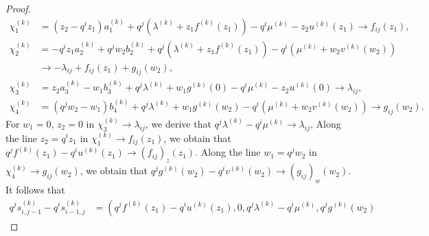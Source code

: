 \documentclass[12pt,reqno]{amsart}%
\theoremstyle{plain}
\numberwithin{theorem}{section} \numberwithin{equation}{section}
\numberwithin{lemma}{section}
\numberwithin{remark}{section}
\numberwithin{example}{section}
\numberwithin{proposition}{section}
\numberwithin{definition}{section}
\numberwithin{corollary}{section}
\begin{document}
\begin{proof}
\begin{align*}
\chi_{1}^{\left(  k\right)  }  &  =\left(  z_{2}-q^{i}z_{1}\right)
a_{1}^{\left(  k\right)  }+q^{j}\left(  \lambda^{\left(  k\right)  }%
+z_{1}f^{\left(  k\right)  }\left(  z_{1}\right)  \right)  -q^{i}\mu^{\left(
k\right)  }-z_{2}u^{\left(  k\right)  }\left(  z_{1}\right)  \rightarrow
f_{ij}\left(  z_{1}\right)  ,\\
\chi_{2}^{\left(  k\right)  }  &  =-q^{i}z_{1}a_{2}^{\left(  k\right)  }%
+q^{j}w_{2}b_{2}^{\left(  k\right)  }+q^{j}\left(  \lambda^{\left(  k\right)
}+z_{1}f^{\left(  k\right)  }\left(  z_{1}\right)  \right)  -q^{i}\left(
\mu^{\left(  k\right)  }+w_{2}v^{\left(  k\right)  }\left(  w_{2}\right)
\right) \\
&  \rightarrow-\lambda_{ij}+f_{ij}\left(  z_{1}\right)  +g_{ij}\left(
w_{2}\right)  ,\\
\chi_{3}^{\left(  k\right)  }  &  =z_{2}a_{3}^{\left(  k\right)  }-w_{1}%
b_{3}^{\left(  k\right)  }+q^{j}\lambda^{\left(  k\right)  }+w_{1}g^{\left(
k\right)  }\left(  0\right)  -q^{i}\mu^{\left(  k\right)  }-z_{2}u^{\left(
k\right)  }\left(  0\right)  \rightarrow\lambda_{ij},\\
\chi_{4}^{\left(  k\right)  }  &  =\left(  q^{j}w_{2}-w_{1}\right)
b_{4}^{\left(  k\right)  }+q^{j}\lambda^{\left(  k\right)  }+w_{1}g^{\left(
k\right)  }\left(  w_{2}\right)  -q^{i}\left(  \mu^{\left(  k\right)  }%
+w_{2}v^{\left(  k\right)  }\left(  w_{2}\right)  \right)  \rightarrow
g_{ij}\left(  w_{2}\right)  .
\end{align*}
For $w_{1}=0$, $z_{2}=0$ in $\chi_{3}^{\left(  k\right)  }\rightarrow
\lambda_{ij}$, we derive that $q^{j}\lambda^{\left(  k\right)  }-q^{i}%
\mu^{\left(  k\right)  }\rightarrow\lambda_{ij}$, Along the line $z_{2}%
=q^{i}z_{1}$ in $\chi_{1}^{\left(  k\right)  }\rightarrow f_{ij}\left(
z_{1}\right)  $, we obtain that $q^{j}f^{\left(  k\right)  }\left(
z_{1}\right)  -q^{i}u^{\left(  k\right)  }\left(  z_{1}\right)  \rightarrow
\left(  f_{ij}\right)  _{z}\left(  z_{1}\right)  $. Along the line
$w_{1}=q^{j}w_{2}$ in $\chi_{4}^{\left(  k\right)  }\rightarrow g_{ij}\left(
w_{2}\right)  $, we obtain that $q^{j}g^{\left(  k\right)  }\left(
w_{2}\right)  -q^{i}v^{\left(  k\right)  }\left(  w_{2}\right)  \rightarrow
\left(  g_{ij}\right)  _{w}\left(  w_{2}\right)  $. It follows that
\begin{align*}
q^{j}s_{i,j-1}^{\left(  k\right)  }-q^{i}s_{i-1,j}^{\left(  k\right)  }  &
=\left(  q^{j}f^{\left(  k\right)  }\left(  z_{1}\right)  -q^{i}u^{\left(
k\right)  }\left(  z_{1}\right)  ,0,q^{j}\lambda^{\left(  k\right)  }-q^{i}%
\mu^{\left(  k\right)  },q^{j}g^{\left(  k\right)  }\left(  w_{2}\right)

\end{align*}
\end{proof}
\end{document}
